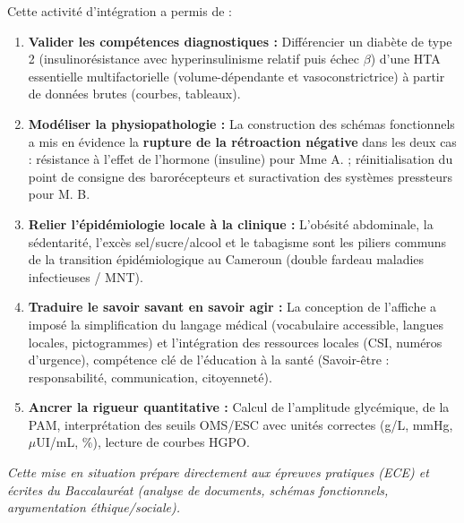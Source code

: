 \documentclass[11pt]{article}
\newcounter{popsec}
\newcounter{popsub}
\newcommand{\courssub}[1]{%
  \stepcounter{popsub}%
  \par\vspace{9pt}\noindent{\popxbold\fontsize{11.5}{13}\selectfont\color{popink}{\color{poporange}\thepopsec.\thepopsub}\hspace{6pt}#1}\par\nopagebreak\vspace{4pt}
}
\begin{document}
\courssub{Bilan de l'activité}
Cette activité d'intégration a permis de :
\begin{enumerate}
    \item \textbf{Valider les compétences diagnostiques :} Différencier un diabète de type 2 (insulinorésistance avec hyperinsulinisme relatif puis échec $\beta$) d'une HTA essentielle multifactorielle (volume-dépendante et vasoconstrictrice) à partir de données brutes (courbes, tableaux).
    \item \textbf{Modéliser la physiopathologie :} La construction des schémas fonctionnels a mis en évidence la \textbf{rupture de la rétroaction négative} dans les deux cas : résistance à l'effet de l'hormone (insuline) pour Mme A. ; réinitialisation du point de consigne des barorécepteurs et suractivation des systèmes pressteurs pour M. B.
    \item \textbf{Relier l'épidémiologie locale à la clinique :} L'obésité abdominale, la sédentarité, l'excès sel/sucre/alcool et le tabagisme sont les piliers communs de la transition épidémiologique au Cameroun (double fardeau maladies infectieuses / MNT).
    \item \textbf{Traduire le savoir savant en savoir agir :} La conception de l'affiche a imposé la simplification du langage médical (vocabulaire accessible, langues locales, pictogrammes) et l'intégration des ressources locales (CSI, numéros d'urgence), compétence clé de l'éducation à la santé (Savoir-être : responsabilité, communication, citoyenneté).
    \item \textbf{Ancrer la rigueur quantitative :} Calcul de l'amplitude glycémique, de la PAM, interprétation des seuils OMS/ESC avec unités correctes (g/L, mmHg, $\mu$UI/mL, \%), lecture de courbes HGPO.
\end{enumerate}
\emph{Cette mise en situation prépare directement aux épreuves pratiques (ECE) et écrites du Baccalauréat (analyse de documents, schémas fonctionnels, argumentation éthique/sociale).}
\end{document}

